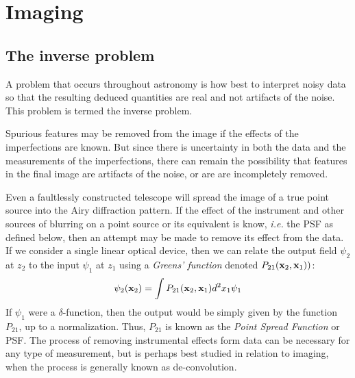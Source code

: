 %
\chapter{Imaging}

\section{The inverse problem}

A problem that occurs throughout astronomy is how best to interpret noisy data so that the resulting deduced quantities are real and not artifacts of the noise. This problem is termed the inverse problem. 

Spurious features may be removed from the image if the effects of the imperfections are known. But since there is uncertainty in both the data and the measurements of the imperfections, there can remain the possibility that features in the final image are artifacts of the noise, or are are incompletely removed.

Even a faultlessly constructed telescope will spread the image of a true point source into the Airy diffraction pattern. If the effect of the instrument and other sources of blurring on a point source or its equivalent is know, {\it i.e.} the PSF as defined below, then an attempt may be made to remove its effect from the data. If we consider a single linear optical device, then we can relate the output field $\psi_2$ at $z_2$ to the input $\psi_1$ at $z_1$ using a {\it Greens' function} denoted $P_{21}({\bf x}_2,{\bf x}_1))$: 
\[
\psi_2({\bf x}_2)=\int P_{21}({\bf x}_2,{\bf x}_1)d^2x_1\psi_1
\]
If $\psi_1$ were a $\delta$-function, then the output would be simply given by the function $P_{21}$, up to a normalization. Thus, $P_{21}$ is known as the {\it Point Spread Function} or PSF. The process of removing instrumental effects form data can be necessary for any type of measurement, but is perhaps best studied in relation to imaging, when the process is generally known as de-convolution.

